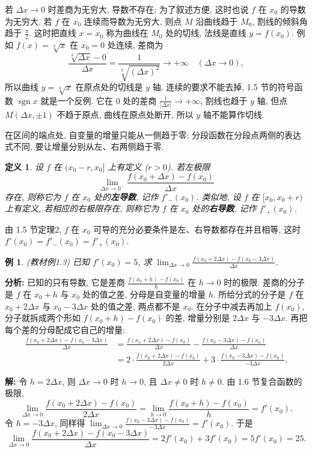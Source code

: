 \documentclass[UTF8,openany]{ctexbook}
\theoremstyle{chinesetextbook}
\newtheorem{definition}{定义}[section]
\newtheorem{example}{例}[section]
\newenvironment{cnsolution}{\par\indent\textbf{解:} \ignorespaces}{\par}
\begin{document}
若 $\Delta x\to0$ 时差商为无穷大, 导数不存在; 为了叙述方便, 这时也说 $f$ 在 $x_0$ 的导数为无穷大. 若 $f$ 在 $x_0$ 连续而导数为无穷大, 则点 $M$ 沿曲线趋于 $M_0$, 割线的倾斜角趋于 $\displaystyle\frac\pi2$. 这时把直线 $x=x_0$ 称为曲线在 $M_0$ 处的切线, 法线是直线 $y=f(x_0)$. 例如 $f(x)=\sqrt[3]x$ 在 $x_0=0$ 处连续, 差商为
\[
\frac{\sqrt[3]{\Delta x}-0}{\Delta x}=\frac1{\sqrt[3]{(\Delta x)^2}}\to+\infty\quad(\Delta x\to0),
\]
所以曲线 $y=\sqrt[3]x$ 在原点处的切线是 $y$ 轴. 连续的要求不能去掉, 1.5 节的符号函数 $\operatorname{sgn}x$ 就是一个反例. 它在 $0$ 处的差商 $\displaystyle\frac1{|\Delta x|}\to+\infty$, 割线也趋于 $y$ 轴, 但点 $M(\Delta x,\pm1)$ 不趋于原点, 曲线在原点处断开, 所以 $y$ 轴不能算作切线.

在区间的端点处, 自变量的增量只能从一侧趋于零; 分段函数在分段点两侧的表达式不同, 要让增量分别从左、右两侧趋于零.
\begin{definition}
设 $f$ 在 $(x_0-r,x_0]$ 上有定义 ($r>0$). 若左极限
\[
\lim_{\Delta x\to0^-}\frac{f(x_0+\Delta x)-f(x_0)}{\Delta x}
\]
存在, 则称它为 $f$ 在 $x_0$ 处的\textbf{左导数}, 记作 $f'_-(x_0)$. 类似地, 设 $f$ 在 $[x_0,x_0+r)$ 上有定义, 若相应的右极限存在, 则称它为 $f$ 在 $x_0$ 处的\textbf{右导数}, 记作 $f'_+(x_0)$.
\end{definition}
由 1.5 节定理2, $f$ 在 $x_0$ 可导的充分必要条件是左、右导数都存在并且相等, 这时 $f'(x_0)=f'_-(x_0)=f'_+(x_0)$.
\begin{example}\label{ex:c2-1-3}
\textnormal{(教材例1.3)} 已知 $f'(x_0)=5$, 求 $\displaystyle\lim_{\Delta x\to0}\frac{f(x_0+2\Delta x)-f(x_0-3\Delta x)}{\Delta x}$.
\end{example}
\par\indent\textbf{分析:} 已知的只有导数, 它是差商 $\displaystyle\frac{f(x_0+h)-f(x_0)}h$ 在 $h\to0$ 时的极限. 差商的分子是 $f$ 在 $x_0+h$ 与 $x_0$ 处的值之差, 分母是自变量的增量 $h$. 所给分式的分子是 $f$ 在 $x_0+2\Delta x$ 与 $x_0-3\Delta x$ 处的值之差, 两点都不是 $x_0$. 在分子中减去再加上 $f(x_0)$, 分子就拆成两个形如 $f(x_0+h)-f(x_0)$ 的差, 增量分别是 $2\Delta x$ 与 $-3\Delta x$. 再把每个差的分母配成它自己的增量:
\[
\begin{aligned}
\frac{f(x_0+2\Delta x)-f(x_0-3\Delta x)}{\Delta x}&=\frac{f(x_0+2\Delta x)-f(x_0)}{\Delta x}-\frac{f(x_0-3\Delta x)-f(x_0)}{\Delta x}\\
&=2\cdot\frac{f(x_0+2\Delta x)-f(x_0)}{2\Delta x}+3\cdot\frac{f(x_0-3\Delta x)-f(x_0)}{-3\Delta x}.
\end{aligned}
\]
\begin{cnsolution}
令 $h=2\Delta x$, 则 $\Delta x\to0$ 时 $h\to0$, 且 $\Delta x\ne0$ 时 $h\ne0$. 由 1.6 节复合函数的极限,
\[
\lim_{\Delta x\to0}\frac{f(x_0+2\Delta x)-f(x_0)}{2\Delta x}=\lim_{h\to0}\frac{f(x_0+h)-f(x_0)}h=f'(x_0).
\]
令 $h=-3\Delta x$, 同样得 $\displaystyle\lim_{\Delta x\to0}\frac{f(x_0-3\Delta x)-f(x_0)}{-3\Delta x}=f'(x_0)$. 于是
\[
\lim_{\Delta x\to0}\frac{f(x_0+2\Delta x)-f(x_0-3\Delta x)}{\Delta x}=2f'(x_0)+3f'(x_0)=5f'(x_0)=25.
\]
\end{cnsolution}
\end{document}
